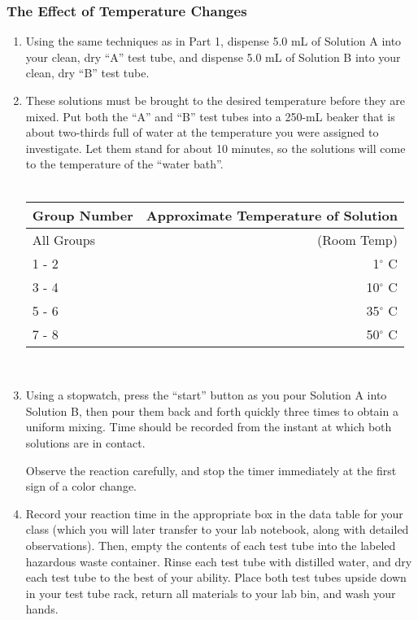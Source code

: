 \documentclass[11pt]{article}
\begin{document}
\subsubsection{The Effect of Temperature Changes}
\begin{enumerate}
\item Using	the	same	techniques	as	in	Part	1,	dispense	5.0	mL	of	Solution	A	into	your	clean,	dry	“A”	test	tube,	and	dispense	5.0	mL	of	Solution	B	into	your	clean,	dry	
“B”	test	tube.	

\item	These	solutions	must	be	brought	to	the	desired	temperature	before	they	are	mixed.		Put	both	the	“A”	and	“B”	test	tubes	into	a	250-mL	beaker	that	is	about	
two-thirds	full	of	water	at	the	temperature	you	were	assigned	to	investigate.		Let	them	stand	for	about	10	minutes,	so	the	solutions	will	come	to	the	temperature	
of	the	“water	bath”.	\\ \\
\begin{tabular}{ | l | r |}
\hline \textbf{\large{Group Number}} & \textbf{\large{Approximate Temperature of Solution}}\\ \hline
	All Groups & (Room Temp) \\ \hline
	1 - 2 	& 1$^\circ$ C			\\ \hline
	3 - 4 	& 10$^\circ$ C 		\\ \hline
	5 - 6 	& 35$^\circ$ C 	\\ \hline
	7 - 8 	& 50$^\circ$ C 		\\ \hline
\end{tabular} \\
\item	Using	a	stopwatch,	press	the	“start”	button	as	you	pour	Solution	A	into	Solution	B,	then	pour	them	back	and	 forth	quickly	three	times	to	obtain	a	uniform	
mixing.		Time	should	be	recorded	from	the	instant	at	which	both	solutions	are	in	contact.	
	
Observe	the	reaction	carefully,	and	stop	the	timer	immediately	at	the	first	sign	of	a	color	change.	
	
\item		Record	 your	reaction	 time	in	 the	appropriate	box	in	 the	data	 table	 for	 your	class	 (which	 you	will	later	 transfer	 to	 your	lab	notebook,	along	with	detailed	
observations).		Then,	empty	the	contents	of	each	test	tube	into	the	labeled	hazardous	waste	container.		Rinse	each	test	tube	with	distilled	water,	and	dry	each	
test	tube	to	the	best	of	your	ability.		Place	both	test	tubes	upside	down	in	your	test	tube	rack,	return	all	materials	to	your	lab	bin,	and	wash	your	hands.
\end{enumerate}
\end{document}
